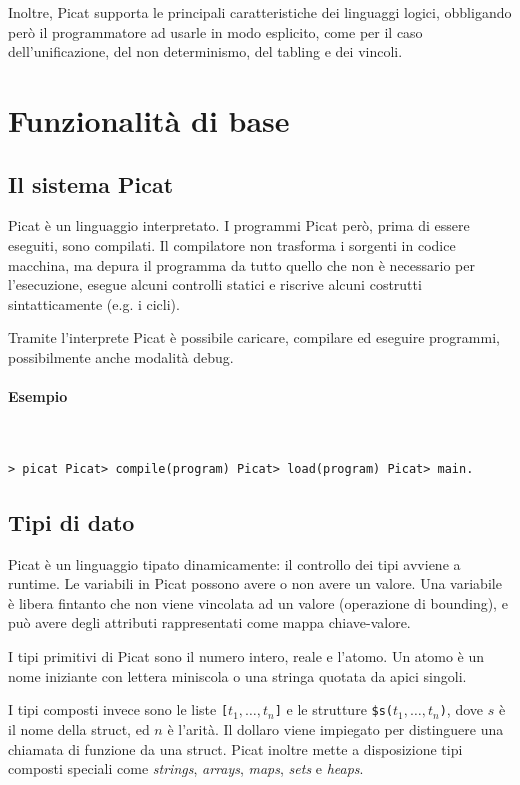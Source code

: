 \documentclass[12pt,a4paper,openright]{book} %
\begin{document}
Inoltre, Picat supporta le principali caratteristiche dei linguaggi
logici, obbligando però il programmatore ad usarle in modo esplicito,
come per il caso dell'unificazione, del non determinismo, del tabling
e dei vincoli.

\section{Funzionalità di base}
\label{sec:picat_base}

\subsection{Il sistema Picat}
\label{subsec:picat_base_system}

Picat è un linguaggio interpretato. I programmi Picat però, prima di
essere eseguiti, sono compilati. Il compilatore non trasforma i
sorgenti in codice macchina, ma depura il programma da tutto quello
che non è necessario per l'esecuzione, esegue alcuni controlli statici
e riscrive alcuni costrutti sintatticamente (e.g. i cicli).

Tramite l'interprete Picat è possibile caricare, compilare ed eseguire
programmi, possibilmente anche modalità debug.

\paragraph{Esempio}\
\begin{verbatim}
> picat Picat> compile(program) Picat> load(program) Picat> main.
\end{verbatim}

\subsection{Tipi di dato}
\label{subsec:picat_base_datatype}

Picat è un linguaggio tipato dinamicamente: il controllo dei tipi
avviene a runtime. Le variabili in Picat possono avere o non avere un
valore. Una variabile è libera fintanto che non viene vincolata ad un
valore (operazione di bounding), e può avere degli attributi
rappresentati come mappa chiave-valore.

I tipi primitivi di Picat sono il numero intero, reale e l'atomo. Un
atomo è un nome iniziante con lettera miniscola o una stringa quotata
da apici singoli.

I tipi composti invece sono le liste \verb|[|$t_1, \ldots,
t_n$\verb|]| e le strutture \verb|$s(|$t_1, \ldots, t_n$\verb|)|, dove
$s$ è il nome della struct, ed $n$ è l'arità. Il dollaro viene
impiegato per distinguere una chiamata di funzione da una
struct. Picat inoltre mette a disposizione tipi composti speciali come
\emph{strings}, \emph{arrays}, \emph{maps}, \emph{sets} e
\emph{heaps}.
\end{document}
